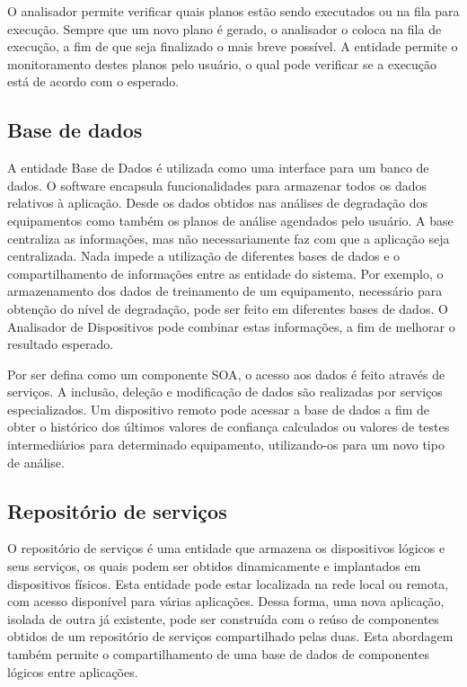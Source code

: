 O analisador permite verificar quais planos estão sendo executados ou na fila para execução. Sempre
que um novo plano é gerado, o analisador o coloca na fila de execução, a fim de que seja
finalizado o mais breve possível. A entidade permite o monitoramento destes planos pelo usuário, o
qual pode verificar se a execução está de acordo com o esperado.


\subsection{Base de dados}

A entidade Base de Dados é utilizada como uma interface para um banco de dados. O software encapsula
funcionalidades para  armazenar todos os dados relativos à aplicação. Desde os dados obtidos nas
análises de degradação dos equipamentos como também os planos de análise agendados pelo usuário. A
base centraliza as informações, mas não necessariamente faz com que a aplicação seja centralizada.
Nada impede a utilização de diferentes bases de dados e o
compartilhamento de informações entre as entidade do sistema. Por exemplo, o armazenamento dos dados
de treinamento de um equipamento, necessário para obtenção do nível de degradação, pode ser feito em
diferentes bases de dados. O Analisador de Dispositivos pode combinar estas informações, a fim de
melhorar o resultado esperado.

Por ser defina como um componente \gls{SOA}, o acesso aos dados é feito através de serviços. A
inclusão, deleção e modificação de dados são realizadas por serviços especializados. Um dispositivo
remoto pode acessar a base de dados a fim de obter o histórico dos últimos valores de confiança
calculados ou valores de testes intermediários para determinado equipamento, utilizando-os para um
novo tipo de análise.


\subsection{Repositório de serviços}

O repositório de serviços é uma entidade que armazena os dispositivos lógicos e seus serviços, os
quais podem ser obtidos dinamicamente e implantados em dispositivos físicos. Esta entidade pode
estar localizada na rede local ou remota, com acesso disponível para várias aplicações. Dessa forma,
uma nova aplicação, isolada de outra já existente, pode ser construída com o reúso de componentes
obtidos de um repositório de serviços compartilhado pelas duas. Esta abordagem também permite o
compartilhamento de uma base de dados de componentes lógicos entre aplicações.


